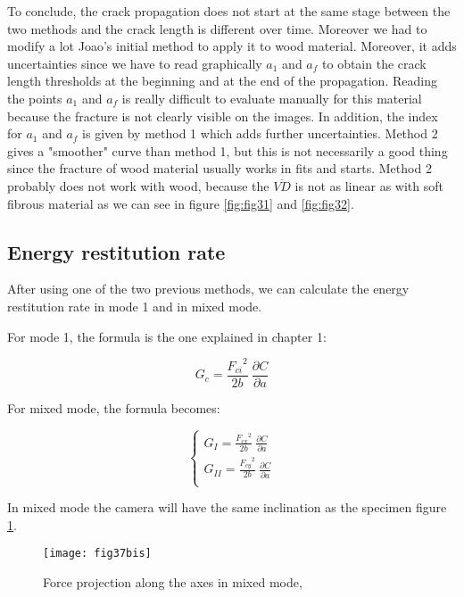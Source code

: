 To conclude, the crack propagation does not start at the same stage between the two methods and the crack length is different over time. Moreover we had to modify a lot Joao's initial method to apply it to wood material. Moreover, it adds uncertainties since we have to read graphically $a_1$ and $a_f$ to obtain the crack length thresholds at the beginning and at the end of the propagation. Reading the points $a_1$ and $a_f$ is really difficult to evaluate manually for this material because the fracture is not clearly visible on the images. In addition, the index for $a_1$ and $a_f$ is given by method 1 which adds further uncertainties. Method 2 gives a "smoother" curve than method 1, but this is not necessarily a good thing since the fracture of wood material usually works in fits and starts. Method 2 probably does not work with wood, because the $\overline{VD}$ is not as linear as with soft fibrous material  as we can see in figure \ref{fig:fig31} and \ref{fig:fig32}.

\subsection{Energy restitution rate}

After using one of the two previous methods, we can calculate the energy restitution rate in mode 1 and in mixed mode.

For mode 1, the formula is the one explained in chapter 1:

\begin{equation}
	G_c=\frac{{F_{ci}}^2}{2b}\ \frac{\partial C}{\partial a}
\end{equation}

For mixed mode, the formula becomes:

\begin{equation}
	\begin{cases}
		G_I=\frac{{F_{cx}}^2}{2b}\ \frac{\partial C}{\partial a} \\
		G_{II}=\frac{{F_{cy}}^2}{2b}\ \frac{\partial C}{\partial a}\\ 
	\end{cases}
\end{equation}

In mixed mode the camera will have the same inclination as the specimen figure \ref{fig:fig37bis}.

\begin{figure}[htp]
	\centering
	\texttt{[image: fig37bis]}
	\caption{Force projection along the axes in mixed mode, \cite{Odounga2018phd}}
	\label{fig:fig37bis}
\end{figure}

